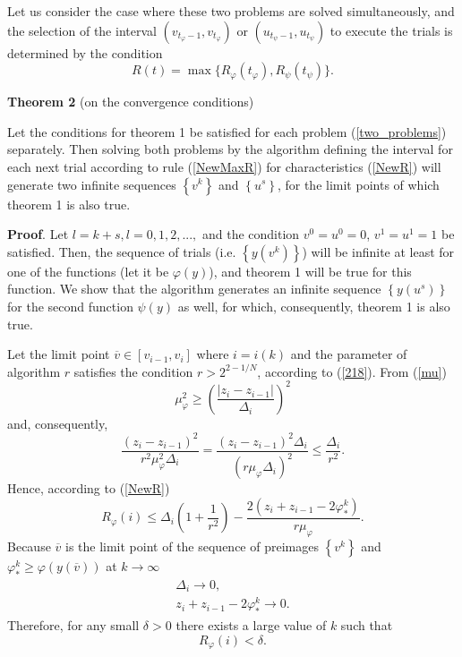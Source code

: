 \documentclass[smallcondensed]{svjour3}     %
\begin{document}
Let us consider the case where these two problems are solved simultaneously, and the selection of the interval $(v_{t_\varphi-1},v_{t_\varphi})$ or $(u_{t_\psi-1},u_{t_\psi})$ to execute the trials is determined by the condition
\begin{equation}\label{NewMaxR}
R(t)=\max\{R_\varphi(t_\varphi),R_\psi(t_\psi)\}.
\end{equation}

\textbf{Theorem 2} (on the convergence conditions)

Let the conditions for theorem 1 be satisfied for each problem (\ref{two_problems}) separately. 
Then solving both problems by the algorithm defining the interval for each next trial according to rule (\ref{NewMaxR}) for characteristics (\ref{NewR}) will generate two infinite sequences $\left\{v^k\right\}$ and $\left\{u^s\right\}$, for the limit points of which theorem 1 is also true.

\textbf{Proof}. Let $l=k+s,l=0,1,2,...,$ and the condition $v^0=u^0=0$, $v^1=u^1=1$ be satisfied. Then, the sequence of trials (i.e. $\left\{y(v^k)\right\}$) will be infinite at least for one of the functions (let it be $\varphi(y)$), and theorem 1 will be true for this function. We show that the algorithm generates an infinite sequence $\left\{y(u^s)\right\}$ for the second function $\psi(y)$ as well, for which, consequently, theorem 1 is  also true.

Let the limit point $\overline{v}\in[v_{i-1},v_i]$ where $i=i(k)$ and the parameter of algorithm $r$ satisfies the condition $r>2^{2-1/N}$, according to (\ref{218}). From (\ref{mu})
\[
\mu_\varphi^2 \geq \left(\frac{|z_i-z_{i-1}|}{\Delta_i}\right)^2
\]
and, consequently,
\[
\frac{(z_i-z_{i-1})^2}{r^2\mu_\varphi^2\Delta_i}=\frac{(z_i-z_{i-1})^2\Delta_i}{(r\mu_\varphi\Delta_i)^2}\leq\frac{\Delta_i}{r^2}.
\]
Hence, according to (\ref{NewR})
\[
R_\varphi(i) \leq \Delta_i\left(1+\frac{1}{r^2}\right)-\frac{2(z_i+z_{i-1}-2\varphi_\ast^k)}{r\mu_\varphi}.
\]
Because $\overline{v}$ is the limit point of the sequence of preimages $\left\{v^k\right\}$ and $\varphi_\ast^k \geq \varphi(y(\overline{v}))$ at $k\rightarrow\infty$
\begin{eqnarray} \nonumber
\Delta_i\rightarrow 0, \\ \nonumber
z_i+z_{i-1}-2\varphi_\ast^k\rightarrow 0. \nonumber
\end{eqnarray}
Therefore, for any small $\delta>0$ there exists a large value of $k$ such that 
\begin{equation}\label{Rleqdelta}
R_\varphi(i)<\delta.
\end{equation}
\end{document}
